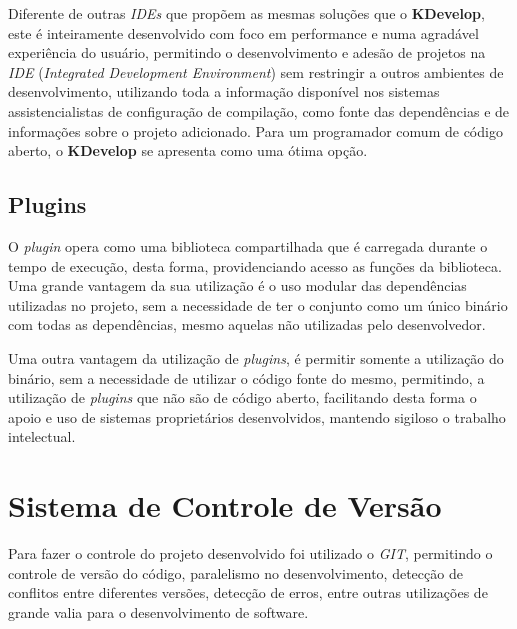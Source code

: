 Diferente de outras \textit{IDEs} que propõem as mesmas soluções que o \textbf{KDevelop}, este é inteiramente desenvolvido
com foco em performance e numa agradável experiência do usuário, permitindo o desenvolvimento e adesão de projetos na \textit{IDE} (\textit{Integrated Development Environment}) sem restringir a outros ambientes de desenvolvimento, utilizando toda a informação disponível nos sistemas assistencialistas de configuração de compilação, como fonte das dependências e de informações sobre o projeto adicionado. Para um programador comum de código aberto, o \textbf{KDevelop} se apresenta como uma ótima opção.


\subsection{Plugins}
O \textit{plugin} opera como uma biblioteca compartilhada que é carregada durante o tempo de execução, desta forma, providenciando acesso as funções da biblioteca. Uma grande vantagem da sua utilização é o uso modular das dependências utilizadas no projeto, sem a necessidade de ter o conjunto como um único binário com todas as dependências, mesmo aquelas não utilizadas pelo desenvolvedor.

Uma outra vantagem da utilização de \textit{plugins}, é permitir somente a utilização do binário, sem a necessidade de utilizar
o código fonte do mesmo, permitindo, a utilização de \textit{plugins} que não são de código aberto, facilitando desta
forma o apoio e uso de sistemas proprietários desenvolvidos, mantendo sigiloso o trabalho intelectual.

\section{Sistema de Controle de Versão}

Para fazer o controle do projeto desenvolvido foi utilizado o \textit{GIT}, permitindo o controle de versão do código, paralelismo no desenvolvimento, detecção de conflitos entre diferentes versões, detecção de erros, entre outras utilizações de grande valia
para o desenvolvimento de software.

